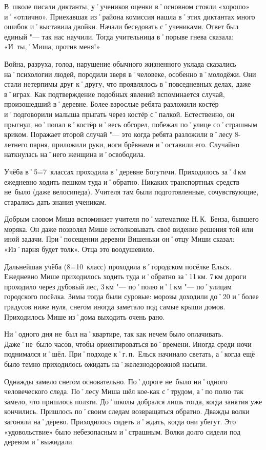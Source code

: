 В~школе писали диктанты, у˚учеников оценки в˚основном стояли «хорошо» и˚«отлично». Приехавшая из˚района комиссия нашла в˚этих диктантах много ошибок и˚выставила двойки. Начали беседовать с˚учениками. Ответ был единый "--- так нас научили. Тогда учительница в˚порыве гнева сказала: «И~ты,˚Миша, против меня!»

Война, разруха, голод, нарушение обычного жизненного уклада сказались на˚психологии людей, породили зверя в˚человеке, особенно в˚молодёжи. Они стали нетерпимы друг к˚другу, что проявлялось в˚повседневных делах, даже в˚играх. Как подтверждение подобных явлений вспоминается случай, произошедший в˚деревне. Более взрослые ребята разложили костёр и˚подговорили малыша прыгать через костёр с˚палкой. Естественно, он прыгнул, но˚попал в˚костёр и˚весь обгорел, побежал по˚улице со˚страшным криком. Поражает второй случай "--- это когда ребята разложили в˚лесу 8-летнего парня, приложили руки, ноги брёвнами и˚оставили его. Случайно наткнулась на˚него женщина и˚освободила.

Учёба в˚5\==7~классах проходила в˚деревне Богутичи. Приходилось за˚4\,км ежедневно ходить пешком туда и˚обратно. Никаких транспортных средств не~было (даже велосипеда). Учителя там были подготовленные, сочувствующие, старались дать знания ученикам. 

Добрым словом Миша вспоминает учителя по˚математике Н.\,К.~Бенза, бывшего моряка. Он даже позволял Мише истолковывать своё видение решения той или иной задачи. При˚посещении деревни Вишеньки он˚отцу Миши сказал: «Из˚парня будет толк». Отца это воодушевило.

Дальнейшая учёба (8\==10~класс) проходила в˚городском посёлке Ельск. Ежедневно Мише приходилось ходить туда и˚обратно за˚11\,км. 7\,км дороги проходило через дубовый лес, 3\,км "--- по˚полю и˚1\,км "--- по˚улицам городского посёлка. Зимы тогда были суровые: морозы доходили до˚20 и˚более градусов ниже нуля, снегом иногда заметало под самые крыши домов. Приходилось Мише из˚дома выходить очень рано. 

Ни˚одного дня не~был на˚квартире, так как нечем было оплачивать. Даже˚не~было часов, чтобы ориентироваться во˚времени. Иногда среди ночи поднимался и˚шёл. При˚подходе к˚г.\,п.~Ельск начинало светать, а˚когда ещё было темно приходилось ожидать на˚железнодорожной насыпи.

Однажды замело снегом основательно. По˚дороге не~было ни˚одного человеческого следа. По˚лесу Миша шёл кое-как с˚трудом, а˚по полю так замело, что пришлось ползти. До˚школы добрался лишь тогда, когда занятия уже кончились. Пришлось по˚своим следам возвращаться обратно. Дважды волки загоняли на˚дерево. Приходилось сидеть и˚ждать, когда они убегут. Это «удовольствие» было небезопасным и˚страшным. Волки долго сидели под деревом и˚выжидали.
\enlargethispage{\baselineskip}		%
\pagebreak							%

